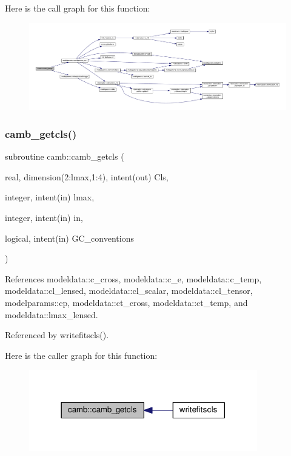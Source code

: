 Here is the call graph for this function\+:
\nopagebreak
\begin{figure}[H]
\begin{center}
\leavevmode
\includegraphics[width=350pt]{namespacecamb_a53e4d3ff396030bd7e41d606cfa458b2_cgraph}
\end{center}
\end{figure}
\mbox{\label{namespacecamb_abeb0ae530a720a17a76108dbed29c1fc}} 
\subsubsection{\texorpdfstring{camb\+\_\+getcls()}{camb\_getcls()}}
{\footnotesize\ttfamily subroutine camb\+::camb\+\_\+getcls (\begin{DoxyParamCaption}\item[{real, dimension(2\+:lmax,1\+:4), intent(out)}]{Cls,  }\item[{integer, intent(in)}]{lmax,  }\item[{integer, intent(in)}]{in,  }\item[{logical, intent(in)}]{G\+C\+\_\+conventions }\end{DoxyParamCaption})}



References modeldata\+::c\+\_\+cross, modeldata\+::c\+\_\+e, modeldata\+::c\+\_\+temp, modeldata\+::cl\+\_\+lensed, modeldata\+::cl\+\_\+scalar, modeldata\+::cl\+\_\+tensor, modelparams\+::cp, modeldata\+::ct\+\_\+cross, modeldata\+::ct\+\_\+temp, and modeldata\+::lmax\+\_\+lensed.



Referenced by writefitscls().

Here is the caller graph for this function\+:
\nopagebreak
\begin{figure}[H]
\begin{center}
\leavevmode
\includegraphics[width=282pt]{namespacecamb_abeb0ae530a720a17a76108dbed29c1fc_icgraph}
\end{center}
\end{figure}
\mbox{\label{namespacecamb_af6f4c73133d3de79ac10db3c4b2d0650}} 
